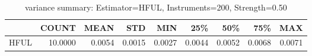 \begin{table}[ht]
\centering
\caption{variance summary: Estimator=HFUL, Instruments=200, Strength=0.50}
\begin{tabular}{lrrrrrrrr}
\toprule
 & COUNT & MEAN & STD & MIN & 25\% & 50\% & 75\% & MAX \\
\midrule
HFUL & 10.0000 & 0.0054 & 0.0015 & 0.0027 & 0.0044 & 0.0052 & 0.0068 & 0.0071 \\
\bottomrule
\end{tabular}
\end{table}
